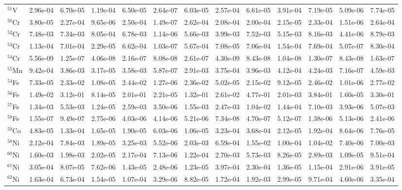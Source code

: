 \begin{landscape}
\begin{table}
\begin{tabular}{l|cc|cc|cc|cc|cc|cc}
$^{51}$V & 2.96e-04 & 6.70e-05 & 1.19e-04 & 6.50e-05 & 2.64e-07 & 6.03e-05 & 2.57e-04 & 6.61e-05 & 3.91e-04 & 7.19e-05 & 5.09e-06 & 7.74e-05\\
$^{50}$Cr & 3.80e-05 & 2.27e-04 & 9.65e-06 & 2.50e-04 & 1.49e-07 & 2.62e-04 & 2.08e-04 & 2.00e-04 & 2.15e-05 & 2.33e-04 & 1.51e-06 & 2.64e-04\\
$^{52}$Cr & 7.48e-03 & 7.34e-03 & 8.05e-04 & 6.78e-03 & 1.14e-06 & 5.66e-03 & 3.99e-03 & 7.52e-03 & 5.15e-03 & 8.16e-03 & 4.41e-06 & 8.79e-03\\
$^{53}$Cr & 1.13e-04 & 7.01e-04 & 2.29e-05 & 6.62e-04 & 1.03e-07 & 5.67e-04 & 7.08e-05 & 7.06e-04 & 1.54e-04 & 7.69e-04 & 5.07e-07 & 8.30e-04\\
$^{54}$Cr & 5.56e-09 & 1.25e-07 & 4.06e-08 & 2.16e-07 & 8.08e-08 & 2.61e-07 & 4.30e-09 & 8.43e-08 & 1.04e-08 & 1.30e-07 & 8.43e-08 & 1.63e-07\\
$^{55}$Mn & 9.42e-04 & 3.86e-03 & 3.17e-05 & 3.58e-03 & 5.87e-07 & 2.91e-03 & 3.75e-04 & 3.96e-03 & 4.12e-04 & 4.24e-03 & 7.16e-07 & 4.59e-03\\
$^{54}$Fe & 7.33e-05 & 2.33e-02 & 1.08e-05 & 2.44e-02 & 1.27e-06 & 2.36e-02 & 5.02e-05 & 2.15e-02 & 9.12e-05 & 2.46e-02 & 1.01e-06 & 2.77e-02\\
$^{56}$Fe & 1.49e-02 & 3.12e-01 & 8.14e-05 & 2.01e-01 & 2.21e-05 & 1.32e-01 & 2.61e-02 & 4.77e-01 & 2.01e-03 & 3.84e-01 & 1.60e-05 & 3.30e-01\\
$^{57}$Fe & 1.34e-03 & 5.53e-03 & 1.24e-05 & 2.59e-03 & 3.50e-06 & 1.55e-03 & 2.47e-03 & 1.04e-02 & 1.44e-04 & 7.10e-03 & 3.93e-06 & 5.07e-03\\
$^{58}$Fe & 1.55e-07 & 9.49e-07 & 2.75e-06 & 4.03e-06 & 4.14e-06 & 5.21e-06 & 7.34e-08 & 4.70e-07 & 5.12e-07 & 1.38e-06 & 5.13e-06 & 2.41e-06\\
$^{59}$Co & 4.83e-05 & 1.33e-04 & 1.65e-05 & 1.90e-05 & 6.03e-06 & 1.06e-05 & 3.23e-04 & 3.68e-04 & 2.12e-05 & 1.92e-04 & 8.64e-06 & 7.76e-05\\
$^{58}$Ni & 2.12e-04 & 7.84e-03 & 1.89e-05 & 3.25e-03 & 5.52e-06 & 2.03e-03 & 6.59e-04 & 1.55e-02 & 1.00e-04 & 1.04e-02 & 7.40e-06 & 7.00e-03\\
$^{60}$Ni & 1.60e-03 & 1.98e-03 & 2.02e-05 & 2.17e-04 & 7.13e-06 & 1.22e-04 & 2.70e-03 & 5.73e-03 & 8.26e-05 & 2.89e-03 & 1.09e-05 & 9.51e-04\\
$^{61}$Ni & 3.05e-04 & 8.07e-05 & 7.62e-06 & 1.43e-05 & 2.48e-06 & 1.23e-05 & 3.97e-04 & 2.30e-04 & 1.36e-05 & 1.15e-04 & 2.91e-06 & 3.91e-05\\
$^{62}$Ni & 1.63e-04 & 6.73e-04 & 1.54e-05 & 1.07e-04 & 3.29e-06 & 8.82e-05 & 1.72e-04 & 1.92e-03 & 2.99e-05 & 9.71e-04 & 4.60e-06 & 3.35e-04\\

\end{tabular}
\end{table}
\end{landscape}
